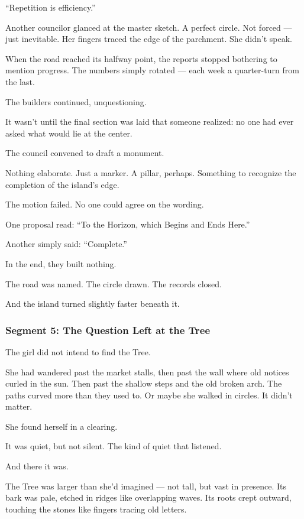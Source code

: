 \documentclass[9pt]{article}
\begin{document}
``Repetition is efficiency.''

Another councilor glanced at the master sketch. A perfect circle. Not forced — just inevitable. Her fingers traced the edge of the parchment. She didn’t speak.

When the road reached its halfway point, the reports stopped bothering to mention progress. The numbers simply rotated — each week a quarter-turn from the last.

The builders continued, unquestioning.

It wasn’t until the final section was laid that someone realized: no one had ever asked what would lie at the center.

The council convened to draft a monument.

Nothing elaborate. Just a marker. A pillar, perhaps. Something to recognize the completion of the island’s edge.

The motion failed. No one could agree on the wording.

One proposal read: ``To the Horizon, which Begins and Ends Here.''

Another simply said: ``Complete.''

In the end, they built nothing.

The road was named. The circle drawn. The records closed.

And the island turned slightly faster beneath it.


\newpage

\subsubsection*{Segment 5: The Question Left at the Tree}

The girl did not intend to find the Tree.

She had wandered past the market stalls, then past the wall where old notices curled in the sun. Then past the shallow steps and the old broken arch. The paths curved more than they used to. Or maybe she walked in circles. It didn’t matter.

She found herself in a clearing.

It was quiet, but not silent. The kind of quiet that listened.

And there it was.

The Tree was larger than she’d imagined — not tall, but vast in presence. Its bark was pale, etched in ridges like overlapping waves. Its roots crept outward, touching the stones like fingers tracing old letters.
\end{document}
